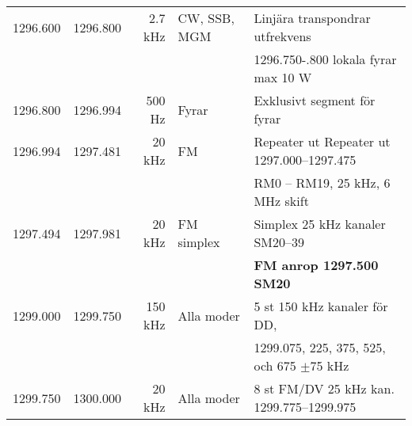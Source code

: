 \begin{landscape}
\begin{tabular}{rrrll}
	         1296.600 & 1296.800 &     2.7 kHz & CW, SSB, MGM    & Linjära transpondrar utfrekvens               \\
	                  &          &             &                 & 1296.750-.800 lokala fyrar max 10 W           \\ \hline
	         1296.800 & 1296.994 &      500 Hz & Fyrar           & Exklusivt segment för fyrar                   \\ \hline
	         1296.994 & 1297.481 &      20 kHz & FM              & Repeater ut Repeater ut 1297.000--1297.475    \\
	                  &          &             &                 & RM0 – RM19, 25 kHz, 6 MHz skift               \\ \hline
	         1297.494 & 1297.981 &      20 kHz & FM simplex      & Simplex 25 kHz kanaler SM20--39               \\
	                  &          &             &                 & \textbf{FM anrop 1297.500 SM20}               \\ \hline
	         1299.000 & 1299.750 &     150 kHz & Alla moder      & 5 st 150 kHz kanaler för DD,                  \\
	                  &          &             &                 & 1299.075, 225, 375, 525, och 675 $\pm$75 kHz  \\ \hline
	         1299.750 & 1300.000 &      20 kHz & Alla moder      & 8 st FM/DV 25 kHz kan. 1299.775--1299.975
\end{tabular}
\end{landscape}

